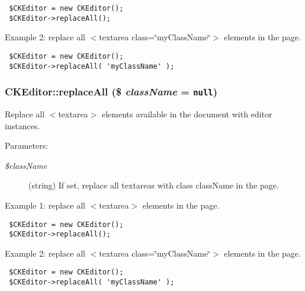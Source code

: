\begin{Code}\begin{verbatim} $CKEditor = new CKEditor();
 $CKEditor->replaceAll();
\end{verbatim}
\end{Code}



Example 2: replace all $<$textarea class=\char`\"{}myClassName\char`\"{}$>$ elements in the page. 

\begin{Code}\begin{verbatim} $CKEditor = new CKEditor();
 $CKEditor->replaceAll( 'myClassName' );
\end{verbatim}
\end{Code}

 \hypertarget{classCKEditor_31836dd682c8d9d6bc5d59063b37c8b8}{
\subsubsection[{replaceAll}]{\setlength{\rightskip}{0pt plus 5cm}CKEditor::replaceAll (\$ {\em className} = {\tt null})}}
\label{classCKEditor_31836dd682c8d9d6bc5d59063b37c8b8}


Replace all $<$textarea$>$ elements available in the document with editor instances.

\begin{Desc}
\item[Parameters:]
\begin{description}
\item[{\em \$className}](string) If set, replace all textareas with class className in the page.\end{description}
\end{Desc}
Example 1: replace all $<$textarea$>$ elements in the page. 

\begin{Code}\begin{verbatim} $CKEditor = new CKEditor();
 $CKEditor->replaceAll();
\end{verbatim}
\end{Code}



Example 2: replace all $<$textarea class=\char`\"{}myClassName\char`\"{}$>$ elements in the page. 

\begin{Code}\begin{verbatim} $CKEditor = new CKEditor();
 $CKEditor->replaceAll( 'myClassName' );
\end{verbatim}
\end{Code}

